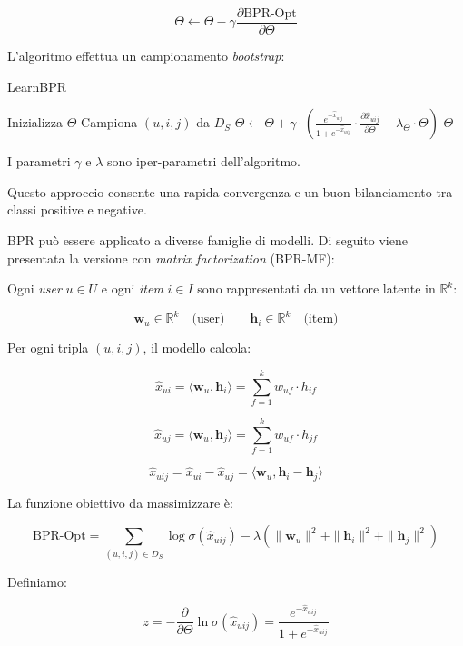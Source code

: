 \documentclass{article}
\begin{document}
\[
\Theta \gets \Theta - \gamma \frac{\partial \text{BPR-Opt}}{\partial \Theta}
\]


L'algoritmo effettua un campionamento \textit{bootstrap}:

\begin{algorithm}[H]
\caption{LearnBPR}
\begin{algorithmic}[1]
    \State Inizializza $\Theta$
    \Repeat
        \State Campiona $(u, i, j)$ da $D_S$
        \State $\Theta \gets \Theta + \gamma \cdot \left( \frac{e^{-\hat{x}_{uij}}}{1 + e^{-\hat{x}_{uij}}} \cdot \frac{\partial \hat{x}_{uij}}{\partial \Theta} - \lambda_\Theta \cdot \Theta \right)$
    \State \Return $\Theta$
\EndProcedure
\end{algorithmic}
\end{algorithm}

I parametri $\gamma$ e $\lambda$ sono iper-parametri dell'algoritmo.

Questo approccio consente una rapida convergenza e un buon bilanciamento tra classi positive e negative.

BPR può essere applicato a diverse famiglie di modelli. Di seguito viene presentata la versione con \textit{matrix factorization} (BPR-MF):

Ogni \textit{user} \( u \in U \) e ogni \textit{item} \( i \in I \) sono rappresentati da un vettore latente in \( \mathbb{R}^k \):

\[
\mathbf{w}_u \in \mathbb{R}^k \quad \text{(user)} \qquad
\mathbf{h}_i \in \mathbb{R}^k \quad \text{(item)}
\]


Per ogni tripla \( (u, i, j) \), il modello calcola:

\[
\hat{x}_{ui} = \langle \mathbf{w}_u, \mathbf{h}_i \rangle = \sum_{f=1}^{k} w_{uf} \cdot h_{if}
\]

\[
\hat{x}_{uj} = \langle \mathbf{w}_u, \mathbf{h}_j \rangle = \sum_{f=1}^{k} w_{uf} \cdot h_{jf}
\]

\[
\hat{x}_{uij} = \hat{x}_{ui} - \hat{x}_{uj} = \langle \mathbf{w}_u, \mathbf{h}_i - \mathbf{h}_j \rangle
\]


La funzione obiettivo da massimizzare è:

\[
\text{BPR-Opt} = \sum_{(u,i,j) \in D_S} \log \sigma(\hat{x}_{uij}) 
- \lambda \left( \|\mathbf{w}_u\|^2 + \|\mathbf{h}_i\|^2 + \|\mathbf{h}_j\|^2 \right)
\]

Definiamo:

\[
z = -\frac{\partial}{\partial \Theta} \ln \sigma(\hat{x}_{uij}) = \frac{e^{-\hat{x}_{uij}}}{1 + e^{-\hat{x}_{uij}}}
\]
\end{document}
